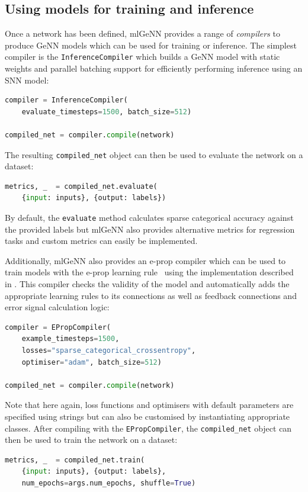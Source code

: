 \documentclass[sigconf]{acmart}
\begin{document}
\subsection{Using models for training and inference}
Once a network has been defined, mlGeNN provides a range of \emph{compilers} to produce GeNN models which can be used for training or inference.
The simplest compiler is the \lstinline{InferenceCompiler} which builds a GeNN model with static weights and parallel batching support for efficiently performing inference using an SNN model:
\begin{lstlisting}[language=Python]
compiler = InferenceCompiler(
    evaluate_timesteps=1500, batch_size=512)

compiled_net = compiler.compile(network)
\end{lstlisting}
The resulting \lstinline{compiled_net} object can then be used to evaluate the network on a dataset:
\begin{lstlisting}[language=Python]
metrics, _  = compiled_net.evaluate(
    {input: inputs}, {output: labels})
\end{lstlisting}
By default, the \lstinline{evaluate} method calculates sparse categorical accuracy against the provided labels but mlGeNN also provides alternative metrics for regression tasks and custom metrics can easily be implemented.

Additionally, mlGeNN also provides an e-prop compiler which can be used to train models with the e-prop learning rule~\citep{Bellec2020} using the implementation described in \citet{Knight2022}.
This compiler checks the validity of the model and automatically adds the appropriate learning rules to its connections as well as feedback connections and error signal calculation logic:
\begin{lstlisting}[language=Python]
compiler = EPropCompiler(
    example_timesteps=1500,
    losses="sparse_categorical_crossentropy",
    optimiser="adam", batch_size=512)

compiled_net = compiler.compile(network)
\end{lstlisting}
Note that here again, loss functions and optimisers with default parameters are specified using strings but can also be customised by instantiating appropriate classes.
After compiling with the \lstinline{EPropCompiler}, the \lstinline{compiled_net} object can then be used to train the network on a dataset:

\begin{lstlisting}[language=Python]
metrics, _  = compiled_net.train(
    {input: inputs}, {output: labels},
    num_epochs=args.num_epochs, shuffle=True)
\end{lstlisting}
\end{document}
